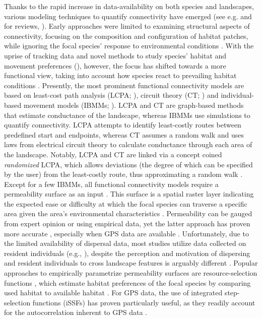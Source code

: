 \documentclass[../FinalThesis.tex]{subfiles}
\begin{document}
Thanks to the rapid increase in data-availability on both species and
landscapes, various modeling techniques to quantify connectivity have emerged
(see e.g. \citealp{Etherington.2016} and \citealp{Diniz.2019} for reviews,
). Early approaches were limited to examining
structural aspects of connectivity, focusing on the composition and
configuration of habitat patches, while ignoring the focal species' response to
environmental conditions \citep{Doerr.2011, Diniz.2019}. With the uprise of
tracking data and novel methods to study species' habitat and movement
preferences (\citealp{Boyce.2002, Fortin.2005, Cushman.2010, Avgar.2016,
Fieberg.2021}), however, the focus has shifted towards a more functional view,
taking into account how species react to prevailing habitat conditions
\citep{Diniz.2019}. Presently, the most prominent functional connectivity models
are based on least-cost path analysis (LCPA; \citealp{Adriaensen.2003}), circuit
theory (CT; \citealp{McRae.2006, McRae.2008}) and individual-based movement
models (IBMMs; \citealp{Kanagaraj.2013, Allen.2016, Hauenstein.2019,
FletcherJr..2019, Zeller.2020, UnnithanKumar.2022, FletcherJr..2023}). LCPA and
CT are graph-based methods that estimate conductance of the landscape, whereas
IBMMs use simulations to quantify connectivity. LCPA attempts to identify
least-costly routes between predefined start and endpoints, whereas CT assumes a
random walk and uses laws from electrical circuit theory to calculate
conductance through each area of the landscape. Notably, LCPA and CT are linked
via a concept coined \textit{randomized} LCPA, which allows deviations (the
degree of which can be specified by the user) from the least-costly route, thus
approximating a random walk \citep{Panzacchi.2016}. Except for a few IBMMs, all
functional connectivity models require a permeability surface as an input
\citep{Diniz.2019}. This surface is a spatial raster layer indicating the
expected ease or difficulty at which the focal species can traverse a specific
area given the area's environmental characteristics \citep{Adriaensen.2003,
Zeller.2012}. Permeability can be gauged from expert opinion or using empirical
data, yet the latter approach has proven more accurate \citep{Clevenger.2002,
Zeller.2012}, especially when GPS data are available \citep{Elliot.2014,
Graves.2014, Gaston.2016, Jackson.2016, Keeley.2017}. Unfortunately, due to the
limited availability of dispersal data, most studies utilize data collected on
resident individuals (e.g., \citealp{Brennan.2020, Lines.2021}), despite the
perception and motivation of dispersing and resident individuals to cross
landscape features is arguably different \citep{Elliot.2014, Benz.2016}. Popular
approaches to empirically parametrize permeability surfaces are
resource-selection functions \citep{Fortin.2005, Manly.2007, Thurfjell.2014,
Cushman.2010}, which estimate habitat preferences of the focal species by
comparing used habitat to available habitat \citep{Zeller.2012}. For GPS data,
the use of integrated step-selection functions (iSSFs) has proven particularly
useful, as they readily account for the autocorrelation inherent to GPS data
\citep{Fortin.2005, Avgar.2016}.
\end{document}
